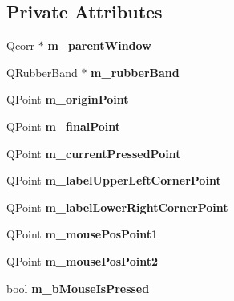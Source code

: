 \subsection*{Private Attributes}
\begin{CompactItemize}
\item 
\hypertarget{classImgLabel_bf77749e36bca018728bde2fc9a974eb}{
\hyperlink{classQcorr}{Qcorr} $\ast$ \textbf{m\_\-parentWindow}}
\label{classImgLabel_bf77749e36bca018728bde2fc9a974eb}

\item 
\hypertarget{classImgLabel_a62e5311b110d0551158c93c6c90e4cf}{
QRubberBand $\ast$ \textbf{m\_\-rubberBand}}
\label{classImgLabel_a62e5311b110d0551158c93c6c90e4cf}

\item 
\hypertarget{classImgLabel_fbbcbd660b7ef7c6048286ac5e350343}{
QPoint \textbf{m\_\-originPoint}}
\label{classImgLabel_fbbcbd660b7ef7c6048286ac5e350343}

\item 
\hypertarget{classImgLabel_6309ebb41fd14f64eb552e772c3bad25}{
QPoint \textbf{m\_\-finalPoint}}
\label{classImgLabel_6309ebb41fd14f64eb552e772c3bad25}

\item 
\hypertarget{classImgLabel_24136f0f97b3f157721c07091a8261ac}{
QPoint \textbf{m\_\-currentPressedPoint}}
\label{classImgLabel_24136f0f97b3f157721c07091a8261ac}

\item 
\hypertarget{classImgLabel_5818aa44b47111a75d4f1d4b749f6ba1}{
QPoint \textbf{m\_\-labelUpperLeftCornerPoint}}
\label{classImgLabel_5818aa44b47111a75d4f1d4b749f6ba1}

\item 
\hypertarget{classImgLabel_e9c219000c7ccb81a73f9784ba9df23b}{
QPoint \textbf{m\_\-labelLowerRightCornerPoint}}
\label{classImgLabel_e9c219000c7ccb81a73f9784ba9df23b}

\item 
\hypertarget{classImgLabel_d58eb83a86663876080a2e24ad016b39}{
QPoint \textbf{m\_\-mousePosPoint1}}
\label{classImgLabel_d58eb83a86663876080a2e24ad016b39}

\item 
\hypertarget{classImgLabel_5d8c18646dda1aaf5c574ed88b63b0ee}{
QPoint \textbf{m\_\-mousePosPoint2}}
\label{classImgLabel_5d8c18646dda1aaf5c574ed88b63b0ee}

\item 
\hypertarget{classImgLabel_b7550fba92f0346edd4a61c1a84eee4d}{
bool \textbf{m\_\-bMouseIsPressed}}
\label{classImgLabel_b7550fba92f0346edd4a61c1a84eee4d}


\end{CompactItemize}
